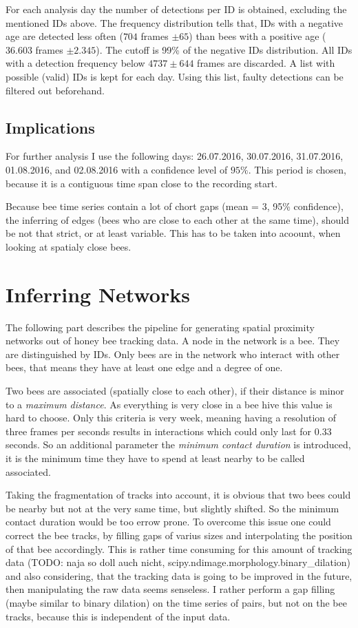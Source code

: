 For each analysis day the number of detections per ID is obtained, excluding the mentioned IDs above. The frequency distribution tells that, IDs with a negative age are detected less often ($704$ frames $\pm 65$)  than bees with a positive age ($36.603$ frames $\pm 2.345$). The cutoff is 99\% of the negative IDs distribution. All IDs with a detection frequency below $4737 \pm 644$ frames are discarded. A list with possible (valid) IDs is kept for each day. Using this list, faulty detections can be filtered out beforehand.

\subsection{Implications}
For further analysis I use the following days: 26.07.2016, 30.07.2016, 31.07.2016, 01.08.2016, and 02.08.2016 with a confidence level of $95\%$. This period is chosen, because it is a contiguous time span close to the recording start.

Because bee time series contain a lot of chort gaps (mean = 3, 95\% confidence), the inferring of edges (bees who are close to each other at the same time), should be not that strict, or at least variable. This has to be taken into acoount, when looking at spatialy close bees.

\section{Inferring Networks}

The following part describes the pipeline for generating spatial proximity networks out of honey bee tracking data. A node in the network is a bee. They are distinguished by IDs. Only bees are in the network who interact with other bees, that means they have at least one edge and a degree of one.

Two bees are associated (spatially close to each other), if their distance is minor to a \emph{maximum distance}. As everything is very close in a bee hive this value is hard to choose. Only this criteria is very week, meaning having a resolution of three frames per seconds results in interactions which could only last for $0.33$ seconds. So an additional parameter the \emph{minimum contact duration} is introduced, it is the minimum time they have to spend at least nearby to be called associated.

Taking the fragmentation of tracks into account, it is obvious that two bees could be nearby but not at the very same time, but slightly shifted. So the minimum contact duration would be too errow prone. To overcome this issue one could correct the bee tracks, by filling gaps of varius sizes and interpolating the position of that bee accordingly. This is rather time consuming for this amount of tracking data (TODO: naja so doll auch nicht, scipy.ndimage.morphology.binary\_dilation) and also considering, that the tracking data is going to be improved in the future, then manipulating the raw data seems senseless. I rather perform a gap filling (maybe similar to binary dilation) on the time series of pairs, but not on the bee tracks, because this is independent of the input data.

